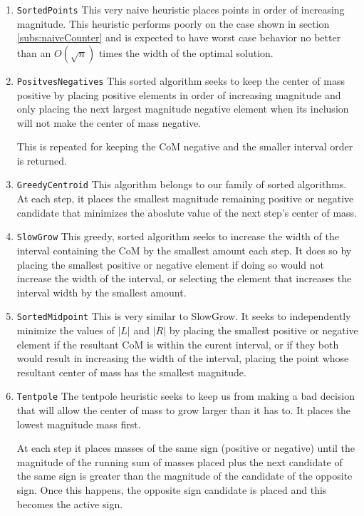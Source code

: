 \begin{enumerate}
\item \texttt{SortedPoints}
This very naive heuristic places points in order of increasing magnitude.  This heuristic performs poorly on the case shown in section \ref{subs:naiveCounter} and is expected to have worst case behavior no better than an $O(\sqrt{n})$ times the width of the optimal solution.

\item \texttt{PositvesNegatives}
  This sorted algorithm seeks to keep the center of mass positive by placing positive elements in order of increasing magnitude and only placing the next largest magnitude negative element when its inclusion will not make the center of mass negative.

This is repeated for keeping the CoM negative and the smaller interval order is returned.

\item \texttt{GreedyCentroid}
  This algorithm belongs to our family of sorted algorithms.  At each step, it places the smallest magnitude remaining positive or negative candidate that minimizes the aboslute value of the next step's center of mass. 

\item \texttt{SlowGrow}
This greedy, sorted algorithm seeks to increase the width of the interval containing the CoM by the smallest amount each step.  It does so by placing the smallest positive or negative element if doing so would not increase the width of the interval, or selecting the element that increases the interval width by the smallest amount. 

\item \texttt{SortedMidpoint}
This is very similar to SlowGrow.  It seeks to independently minimize the values of $|L|$ and $|R|$ by placing the smallest positive or negative element if the resultant CoM is within the curent interval, or if they both would result in increasing the width of the interval, placing the point whose resultant center of mass has the smallest magnitude.

\item \texttt{Tentpole}
The tentpole heuristic seeks to keep us from making a bad decision that will allow the center of mass to grow larger than it has to.  It places the lowest magnitude mass first.  

At each step it places masses of the same sign (positive or negative) until the magnitude of the running sum of masses placed plus the next candidate of the same sign is greater than the magnitude of the candidate of the opposite sign.  Once this happens, the opposite sign candidate is placed and this becomes the active sign.


\end{enumerate}
